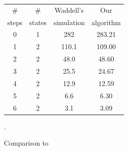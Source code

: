 \documentclass[a0paper,landscape]{baposter}
\begin{document}
\begin{poster}
{\begin{figure}
\begin{tabular}{|cc|c|c|}
\hline
\# & \#  & Waddell's  & Our \\
 steps & states & simulation &  algorithm\\
\hline
0 & 1 & 282 & 283.21\\
1 & 2 & 110.1 & 109.00\\
2 & 2 & 48.0 & 48.60\\
3 & 2 & 25.5 & 24.67\\
4 & 2 & 12.9 & 12.59\\
5 & 2 & 6.6 & 6.30\\
6 & 2 & 3.1 & 3.09\\
\hline
\end{tabular}
\caption{Comparison to }\label{ComparisonToWaddell}.

\end{figure}


}
\end{poster}
\end{document}
